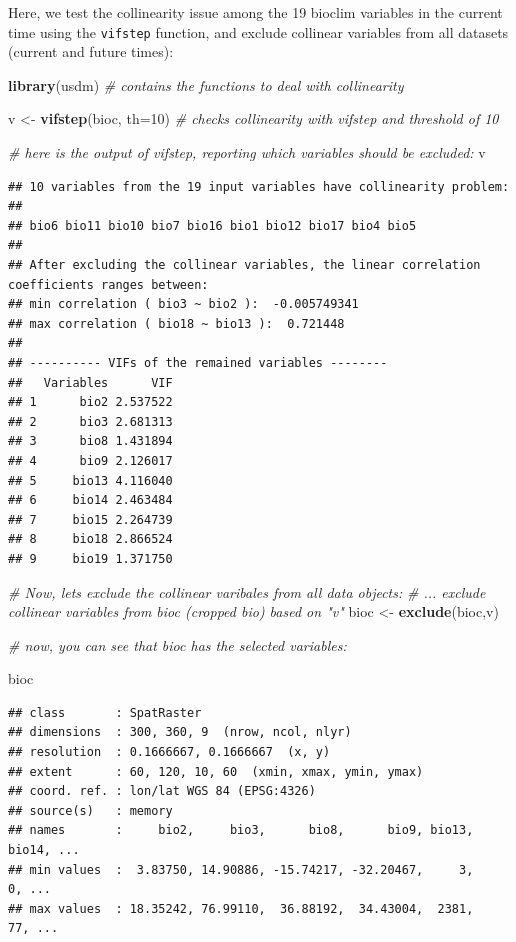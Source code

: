 \documentclass[
]{article}
\newenvironment{Shaded}{\begin{snugshade}}{\end{snugshade}}
\newcommand{\AttributeTok}[1]{\textcolor[rgb]{0.13,0.29,0.53}{#1}}
\newcommand{\CommentTok}[1]{\textcolor[rgb]{0.56,0.35,0.01}{\textit{#1}}}
\newcommand{\DecValTok}[1]{\textcolor[rgb]{0.00,0.00,0.81}{#1}}
\newcommand{\FunctionTok}[1]{\textcolor[rgb]{0.13,0.29,0.53}{\textbf{#1}}}
\newcommand{\NormalTok}[1]{#1}
\newcommand{\OtherTok}[1]{\textcolor[rgb]{0.56,0.35,0.01}{#1}}
\begin{document}
Here, we test the collinearity issue among the 19 bioclim variables in
the current time using the \texttt{vifstep} function, and exclude
collinear variables from all datasets (current and future times):

\begin{Shaded}
\begin{Highlighting}[]
\FunctionTok{library}\NormalTok{(usdm) }\CommentTok{\# contains the functions to deal with collinearity}

\NormalTok{v }\OtherTok{\textless{}{-}} \FunctionTok{vifstep}\NormalTok{(bioc, }\AttributeTok{th=}\DecValTok{10}\NormalTok{) }\CommentTok{\# checks collinearity with vifstep and threshold of 10}

\CommentTok{\# here is the output of vifstep, reporting which variables should be excluded:}
\NormalTok{v}
\end{Highlighting}
\end{Shaded}

\begin{verbatim}
## 10 variables from the 19 input variables have collinearity problem: 
##  
## bio6 bio11 bio10 bio7 bio16 bio1 bio12 bio17 bio4 bio5 
## 
## After excluding the collinear variables, the linear correlation coefficients ranges between: 
## min correlation ( bio3 ~ bio2 ):  -0.005749341 
## max correlation ( bio18 ~ bio13 ):  0.721448 
## 
## ---------- VIFs of the remained variables -------- 
##   Variables      VIF
## 1      bio2 2.537522
## 2      bio3 2.681313
## 3      bio8 1.431894
## 4      bio9 2.126017
## 5     bio13 4.116040
## 6     bio14 2.463484
## 7     bio15 2.264739
## 8     bio18 2.866524
## 9     bio19 1.371750
\end{verbatim}

\begin{Shaded}
\begin{Highlighting}[]
\CommentTok{\# Now, let\textquotesingle{}s exclude the collinear varibales from all data objects:}
\CommentTok{\# ... exclude collinear variables from bioc (cropped bio) based on "v"}
\NormalTok{bioc }\OtherTok{\textless{}{-}} \FunctionTok{exclude}\NormalTok{(bioc,v)}

\CommentTok{\# now, you can see that bioc has the selected variables:}

\NormalTok{bioc}
\end{Highlighting}
\end{Shaded}

\begin{verbatim}
## class       : SpatRaster 
## dimensions  : 300, 360, 9  (nrow, ncol, nlyr)
## resolution  : 0.1666667, 0.1666667  (x, y)
## extent      : 60, 120, 10, 60  (xmin, xmax, ymin, ymax)
## coord. ref. : lon/lat WGS 84 (EPSG:4326) 
## source(s)   : memory
## names       :     bio2,     bio3,      bio8,      bio9, bio13, bio14, ... 
## min values  :  3.83750, 14.90886, -15.74217, -32.20467,     3,     0, ... 
## max values  : 18.35242, 76.99110,  36.88192,  34.43004,  2381,    77, ...
\end{verbatim}
\end{document}

